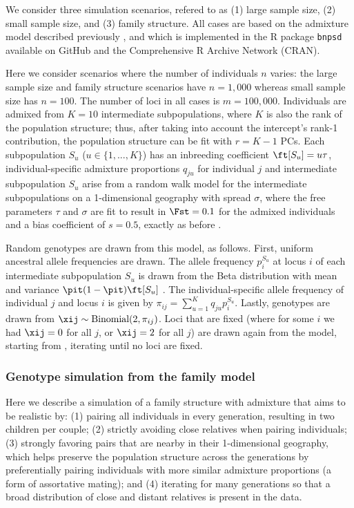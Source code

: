 \documentclass[11pt]{article}
\begin{document}
We consider three simulation scenarios, refered to as (1) large sample size, (2) small sample size, and (3) family structure.
All cases are based on the admixture model described previously \citep{ochoa_fst1, ochoa_fst2}, and which is implemented in the R package \texttt{bnpsd} available on GitHub and the Comprehensive R Archive Network (CRAN).

Here we consider scenarios where the number of individuals $n$ varies:
the large sample size and family structure scenarios have $n = 1,000$ whereas small sample size has $n = 100$.
The number of loci in all cases is $m = 100,000$.
Individuals are admixed from $K = 10$ intermediate subpopulations, where $K$ is also the rank of the population structure; thus, after taking into account the intercept's rank-1 contribution, the population structure can be fit with $r = K-1$ PCs.
Each subpopulation $S_u$ ($u \in \{ 1, ..., K \}$) has an inbreeding coefficient $\ft[S_u] = u \tau$, individual-specific admixture proportions $q_{ju}$ for individual $j$ and intermediate subpopulation $S_u$ arise from a random walk model for the intermediate subpopulations on a 1-dimensional geography with spread $\sigma$, where the free parameters $\tau$ and $\sigma$ are fit to result in $\Fst = 0.1$ for the admixed individuals and a bias coefficient of $s = 0.5$, exactly as before \citep{ochoa_fst2}.

Random genotypes are drawn from this model, as follows.
First, uniform ancestral allele frequencies \pit are drawn.
The allele frequency $p_i^{S_u}$ at locus $i$ of each intermediate subpopulation $S_u$ is drawn from the Beta distribution with mean \pit and variance $\pit(1-\pit) \ft[S_u]$ \citep{balding_method_1995}.
The individual-specific allele frequency of individual $j$ and locus $i$ is given by
$
\pi_{ij} = \sum_{u = 1}^K q_{ju} p_i^{S_u}.
$
Lastly, genotypes are drawn from $\xij \sim \text{Binomial}(2, \pi_{ij})$.
Loci that are fixed (where for some $i$ we had $\xij = 0$ for all $j$, or $\xij = 2$ for all $j$) are drawn again from the model, starting from \pit, iterating until no loci are fixed.

\subsubsection{Genotype simulation from the family model}

Here we describe a simulation of a family structure with admixture that aims to be realistic by:
(1) pairing all individuals in every generation, resulting in two children per couple;
(2) strictly avoiding close relatives when pairing individuals;
(3) strongly favoring pairs that are nearby in their 1-dimensional geography, which helps preserve the population structure across the generations by preferentially pairing individuals with more similar admixture proportions (a form of assortative mating); and
(4) iterating for many generations so that a broad distribution of close and distant relatives is present in the data.
\end{document}
